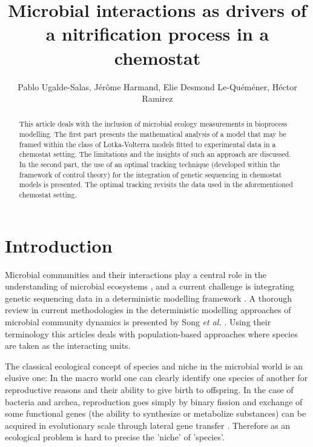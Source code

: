 \documentclass[3p,times]{article}
\begin{document}
\title{Microbial interactions as drivers of a nitrification process in a chemostat}

\author{Pablo Ugalde-Salas, Jérôme Harmand, Elie Desmond Le-Quéméner, Héctor Ramirez}
\date{}
\maketitle



\begin{abstract}
	This article deals with the inclusion of microbial ecology measurements in bioprocess modelling. The first part presents the mathematical analysis of a model that may be framed within the class of Lotka-Volterra models fitted to experimental data in a chemostat setting. The limitations and the insights of such an approach are discussed. In the second part,  the use of an optimal tracking technique (developed within the framework of control theory) for the integration of genetic sequencing in chemostat models is presented. The optimal tracking revisits the data used in the aforementioned chemostat setting. 
\end{abstract}



\section{Introduction}


Microbial communities and their interactions play a central role in the understanding of microbial ecosystems \cite{West2007}, and a current challenge is integrating genetic sequencing data in a deterministic modelling framework \cite{Widder2016,WADE201664}. A thorough review in current methodologies in the deterministic modelling approaches of microbial community dynamics is presented by Song \textit{et al.} \cite{Song2014}. Using their terminology this articles deals with population-based approaches where species are taken as the interacting units.

The classical ecological concept of species and niche in the microbial world is an elusive one: In the macro world one can clearly identify one species of another for reproductive reasons and their ability to give birth to offspring. In the case of bacteria and archea, reproduction goes simply by binary fission and exchange of some functional genes (the ability to synthesize or metabolize substances) can be acquired in evolutionary scale through lateral gene transfer \cite{Boucher2003}. Therefore as an ecological problem is hard to precise the 'niche' of 'species'.
\end{document}
